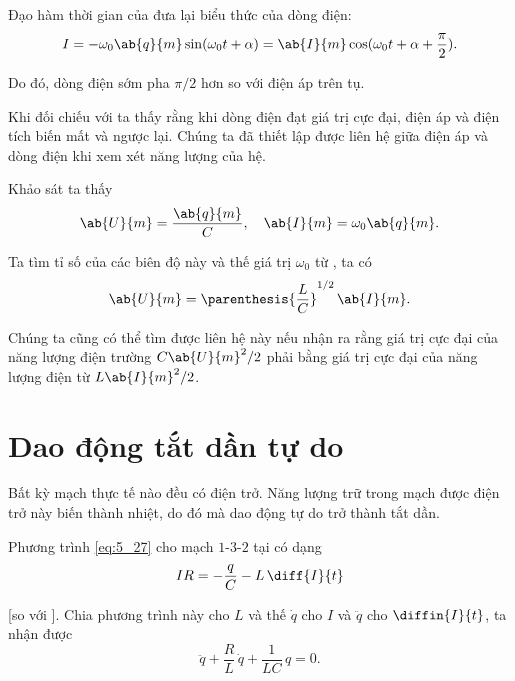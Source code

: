 Đạo hàm thời gian của  đưa lại biểu thức của dòng điện:
\begin{equation}\label{eq:13_8}
    I = - \omega_0 \ab{q}{m} \sin(\omega_0 t + \alpha) = \ab{I}{m} \cos(\omega_0 t + \alpha + \frac{\pi}{2}).
\end{equation}

\noindent
Do đó, dòng điện sớm pha $\pi/2$ hơn so với điện áp trên tụ.

Khi đối chiếu  với  ta thấy rằng khi dòng điện đạt giá trị cực đại, điện áp và điện tích biến mất và ngược lại.
Chúng ta đã thiết lập được liên hệ giữa điện áp và dòng điện khi xem xét năng lượng của hệ.

Khảo sát  ta thấy
\begin{equation*}
    \ab{U}{m} = \frac{\ab{q}{m}}{C}, \quad \ab{I}{m} = \omega_0 \ab{q}{m}.
\end{equation*}

\noindent
Ta tìm tỉ số của các biên độ này và thế giá trị $\omega_0$ từ , ta có
\begin{equation}\label{eq:13_9}
    \ab{U}{m} = \parenthesis{\frac{L}{C}}^{1/2}\, \ab{I}{m}.
\end{equation}

\noindent
Chúng ta cũng có thể tìm được liên hệ này nếu nhận ra rằng giá trị cực đại của năng lượng điện trường $C\ab{U}{m}^2/2$ phải bằng giá trị cực đại của năng lượng điện từ $L\ab{I}{m}^2/2$.

\section{Dao động tắt dần tự do}\label{sec:13_3}

Bất kỳ mạch thực tế nào đều có điện trở.
Năng lượng trữ trong mạch được điện trở này biến thành nhiệt, do đó mà dao động tự do trở thành tắt dần.


Phương trình \eqref{eq:5_27} cho mạch $1$-$3$-$2$ tại  có dạng
\begin{equation}\label{eq:13_10}
    IR = - \frac{q}{C} - L\, \diff{I}{t}
\end{equation}

[so với ].
Chia phương trình này cho $L$ và thế $\dot{q}$ cho $I$ và  $\ddot{q}$ cho $\diffin{I}{t}$, ta nhận được
\begin{equation}\label{eq:13_11}
    \ddot{q} + \frac{R}{L}\, \dot{q} + \frac{1}{LC}\, q = 0.
\end{equation}

